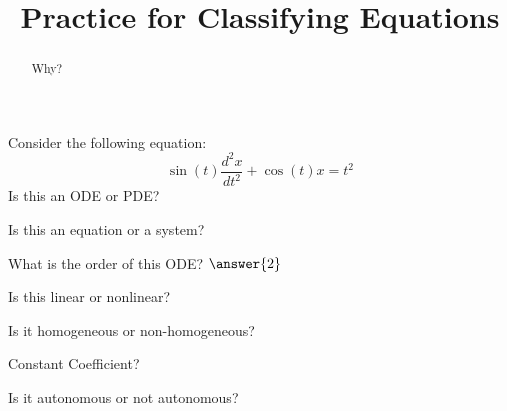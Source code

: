 \documentclass{ximera}
\title{Practice for Classifying Equations}
\begin{document}
\begin{abstract}
    Why?
\end{abstract}
\maketitle


\begin{exercise}
    Consider the following equation:  
    \[
        \displaystyle \sin(t) \frac{d^2 x}{dt^2} + \cos(t) x = t^2
    \]
    Is this an ODE or PDE?
    \begin{multipleChoice}
    \end{multipleChoice}
    \begin{problem}
        Is this an equation or a system?
        \begin{multipleChoice}
        \end{multipleChoice}
        
        \begin{problem}
            What is the order of this ODE? $\answer{2}$
            
            \begin{problem}
                Is this linear or nonlinear?
                \begin{multipleChoice}
                \end{multipleChoice}
                
                \begin{problem}
                    Is it homogeneous or non-homogeneous?
                    \begin{multipleChoice}
                    \end{multipleChoice}
                    
                    \begin{problem}
                        Constant Coefficient?
                        \begin{multipleChoice}
                        \end{multipleChoice}
                    \end{problem}
                    
                \end{problem}
            \end{problem}
        \end{problem}
    \end{problem}
    \begin{problem}
        Is it autonomous or not autonomous?
        \begin{multipleChoice}
        \end{multipleChoice}
    \end{problem}
\end{exercise}
\end{document}
